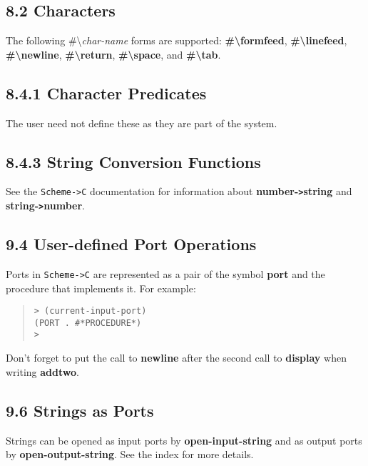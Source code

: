 \documentclass[10pt]{article}
\begin{document}
\subsection*{8.2 Characters}

The following \#\textbackslash{}\emph{char-name} forms are supported: \textbf{\#\textbackslash{}formfeed},
\textbf{\#\textbackslash{}linefeed}, \textbf{\#\textbackslash{}newline}, \textbf{\#\textbackslash{}return}, \textbf{\#\textbackslash{}space}, and \textbf{\#\textbackslash{}tab}.

\subsection*{8.4.1 Character Predicates}

The user need not define these as they are part of the system.

\subsection*{8.4.3 String Conversion Functions}

See the \texttt{Scheme->C} documentation for information about
\textbf{number-\texttt{>}string} and \textbf{string-\texttt{>}number}.

\subsection*{9.4 User-defined Port Operations}

Ports in \texttt{Scheme->C} are represented as a pair of the symbol
\textbf{port} and the procedure that implements it.  For example:

\begin{quote}
\begin{verbatim}
> (current-input-port)
(PORT . #*PROCEDURE*)
>
\end{verbatim}
\end{quote}

Don't forget to put the call to \textbf{newline} after the second
call to \textbf{display} when writing \textbf{addtwo}.

\subsection*{9.6 Strings as Ports}

Strings can be opened as input ports by \textbf{open-input-string} and
as output ports by \textbf{open-output-string}.  See the index for more
details.
\end{document}
